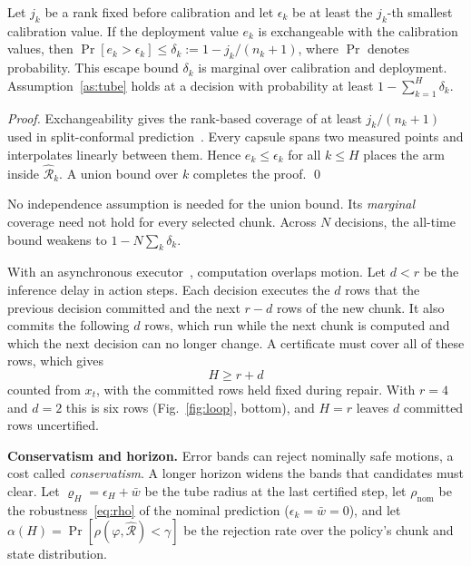 \documentclass[runningheads]{llncs}
\newcommand{\Rh}{\hat{\mathcal{R}}}
\begin{document}
\begin{corollary}\label{cor:conformal}
Let $j_k$ be a rank fixed before calibration and let $\epsilon_k$ be at least
the $j_k$-th smallest calibration value. If the deployment value $e_k$ is
exchangeable with the calibration values, then
$\Pr[e_k>\epsilon_k]\le\delta_k:=1-j_k/(n_k+1)$, where $\Pr$ denotes
probability. This escape bound $\delta_k$ is marginal over calibration
and deployment. Assumption~\ref{as:tube} holds at a decision with
probability at least $1-\sum_{k=1}^H\delta_k$.
\end{corollary}
\begin{proof}
Exchangeability gives the rank-based coverage of at least $j_k/(n_k+1)$
used in split-conformal prediction~\cite{angelopoulos2023conformal}.
Every capsule spans two measured points and interpolates linearly
between them. Hence $e_k \le \epsilon_k$ for all
$k \le H$ places the arm inside $\Rh_k$. A union bound over $k$ completes
the proof. \qed
\end{proof}

No independence assumption is needed for the union bound. Its
\emph{marginal} coverage need not hold for every selected chunk. Across
$N$ decisions, the all-time bound weakens to $1-N\sum_{k}\delta_k$.

\begin{remark}\label{rem:delay}
With an asynchronous executor~\cite{black2025rtc}, computation overlaps
motion. Let $d<r$ be the inference delay in action steps.
Each decision executes the $d$ rows that the
previous decision committed and the next $r - d$ rows of the new chunk. It
also commits the following $d$ rows, which run while the next chunk is
computed and which the next decision can no longer change. A certificate
must cover all of these rows, which gives
\begin{equation}
H \ge r + d
\label{eq:delay}
\end{equation}
counted from $x_t$, with the committed rows held fixed during repair. With $r=4$ and $d=2$ this is six rows (Fig.~\ref{fig:loop}, bottom), and
$H = r$ leaves $d$ committed rows uncertified.
\end{remark}

\textbf{Conservatism and horizon.} Error bands can reject nominally safe
motions, a cost called \emph{conservatism}. A longer horizon widens the
bands that candidates must clear. Let
$\varrho_H = \epsilon_H + \bar w$ be the tube radius at the last certified
step, let $\rho_{\mathrm{nom}}$ be the robustness~\eqref{eq:rho} of the
nominal prediction ($\epsilon_k = \bar w = 0$), and let
$\alpha(H) = \Pr[\rho(\varphi, \Rh) < \gamma]$ be the rejection rate over the
policy's chunk and state distribution.
\end{document}
